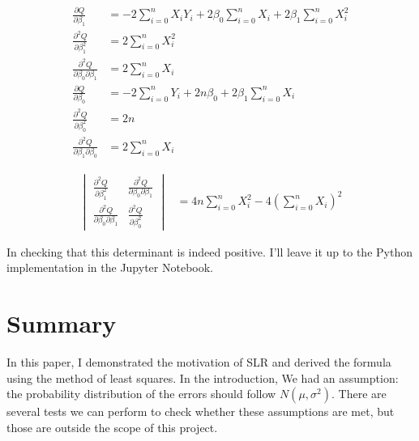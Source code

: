 \documentclass[12pt,a4paper]{article}
\begin{document}
\begin{align*}
    \frac{\partial Q}{\partial \beta_1} &=   -2\sum_{i=0}^{n}X_iY_i +2\beta_0\sum_{i=0}^{n}X_i + 2\beta_1\sum_{i=0}^{n}X_i^2  \\
    \frac{\partial^2 Q}{\partial \beta_1^2} &= 2\sum_{i=0}^{n}X_i^2  \\
      \frac{\partial^2 Q}{\partial \beta_0 \partial \beta_1} &=   2\sum_{i=0}^{n}X_i\\
\frac{\partial Q}{\partial \beta_0} &=  -2\sum_{i=0}^{n}Y_i + 2n\beta_0 +2\beta_1\sum_{i=0}^{n}X_i \\
\frac{\partial^2 Q}{\partial \beta_0^2} &=  2n \\
\frac{\partial^2 Q}{\partial \beta_1\partial \beta_0} &=   2\sum_{i=0}^{n}X_i
\end{align*}

\begin{align*}
    \begin{vmatrix} \displaystyle\frac{\partial^2 Q}{\partial \beta_1^2} &  \displaystyle\frac{\partial^2 Q}{\partial \beta_0 \partial \beta_1} \\ \displaystyle\frac{\partial^2 Q}{\partial \beta_0 \partial \beta_1} & \displaystyle\frac{\partial^2 Q}{\partial \beta_0^2} \end{vmatrix}  &= 4n\sum_{i=0}^{n}X_i^2 - 4\left(\sum_{i=0}^{n}X_i\right)^2
\end{align*}

In checking that this determinant is indeed positive. I'll leave it up to the Python implementation in the Jupyter Notebook.

\section{Summary}
In this paper, I demonstrated the motivation of SLR and derived the formula using the method of least squares. In the introduction, We had an assumption: the probability distribution of the errors should follow $N(\mu, \sigma^2)$. There are several tests we can perform to check whether these assumptions are met, but those are outside the scope of this project.
\end{document}
